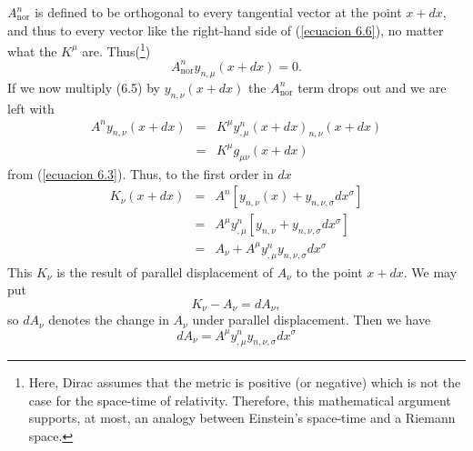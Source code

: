 $A^n_{\mbox{nor}}$ is defined to be orthogonal to every tangential vector at the point $x+dx$, and thus to every vector like the right-hand side of (\ref{ecuacion 6.6}), no matter what the $K^\mu$ are. Thus(\footnote{Here, Dirac assumes that the metric is positive (or negative) which is not the case for the space-time of relativity. Therefore, this mathematical argument supports, at most, an analogy between Einstein's space-time and a Riemann space.})
\[
 A^n_{\mbox{nor}} y_{n,\mu}(x + dx) = 0.
\]
If we now multiply (6.5) by $y_{n,\nu} (x+dx)$ the $A^n_{\mbox{nor}}$ term drops out and we are left with
\[
 \begin{array}{rcl}
  A^n y_{n,\nu}(x + dx ) & = & K^\mu y^n_{,\mu}(x+dx)_{n,\nu}(x + dx)\\
                         & = & K^\mu g_{\mu\nu}(x + dx)
 \end{array}
\]
from (\ref{ecuacion 6.3}). Thus, to the first order in $dx$
\[
 \begin{array}{rcl}
  K_{\nu}(x + dx) & = & A^n\left[ y_{n,\nu}(x) + y_{n,\nu,\sigma} dx^\sigma \right]\\
                  & = & A^\mu y^n_{,\mu} \left[ y_{n,\nu} + y_{n,\nu,\sigma} d x^\sigma \right]\\
                  & = & A_\nu + A^\mu y^n_{,\mu} y_{n,\nu,\sigma} d x^\sigma
 \end{array}
\]
This $K_\nu$ is the result of parallel displacement of $A_\nu$ to the point $x+ dx$. We may put
\[
 K_\nu - A_\nu = d A_\nu,
\]
so $dA_\nu$ denotes the change in $A_\nu$ under parallel displacement. Then we have
\begin{equation}
 \label{ecuacion 6.7}
 d A_\nu = A^\mu y^n_{,\mu} y_{n,\nu,\sigma} d x^\sigma
\end{equation}

